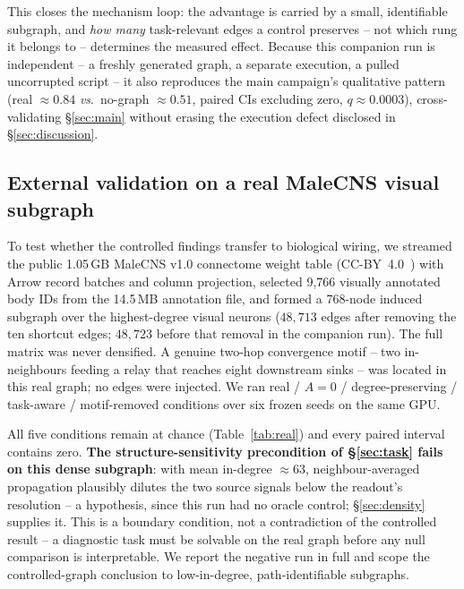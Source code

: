 \documentclass[10pt,twocolumn,letterpaper]{article}
\begin{document}
This closes the mechanism loop: the advantage is carried by a small,
identifiable subgraph, and \emph{how many} task-relevant edges a control
preserves -- not which rung it belongs to -- determines the measured effect.
Because this companion run is independent -- a freshly generated graph, a
separate execution, a pulled uncorrupted script -- it also reproduces the
main campaign's qualitative pattern (real $\approx\!0.84$ \emph{vs}.\
no-graph $\approx\!0.51$, paired CIs excluding zero, $q\!\approx\!0.0003$),
cross-validating \S\ref{sec:main} without erasing the execution defect
disclosed in \S\ref{sec:discussion}.

\subsection{External validation on a real MaleCNS visual subgraph}
\label{sec:realconnectome}

To test whether the controlled findings transfer to biological wiring, we
streamed the public 1.05\,GB MaleCNS v1.0 connectome weight table
(CC-BY~4.0~\cite{malecns2026}) with Arrow record batches and column
projection, selected 9{,}766 visually annotated body IDs from the 14.5\,MB
annotation file, and formed a 768-node induced subgraph over the
highest-degree visual neurons ($48{,}713$ edges after removing the ten
shortcut edges; $48{,}723$ before that removal in the companion run). The full matrix was never densified. A
genuine two-hop convergence motif -- two in-neighbours feeding a relay that
reaches eight downstream sinks -- was located in this real graph; no edges
were injected. We ran real / $A\!=\!0$ / degree-preserving / task-aware /
motif-removed conditions over six frozen seeds on the same GPU.

All five conditions remain at chance (Table~\ref{tab:real}) and every paired
interval contains zero. \textbf{The structure-sensitivity precondition of
\S\ref{sec:task} fails on this dense subgraph}: with mean in-degree
$\approx\!63$, neighbour-averaged propagation plausibly dilutes the two source
signals below the readout's resolution -- a hypothesis, since this run had no
oracle control; \S\ref{sec:density} supplies it. This is a boundary condition,
not a contradiction of the controlled result -- a diagnostic task must be
solvable on the real graph before any null comparison is interpretable. We
report the negative run in full and scope the controlled-graph conclusion to
low-in-degree, path-identifiable subgraphs.
\end{document}
